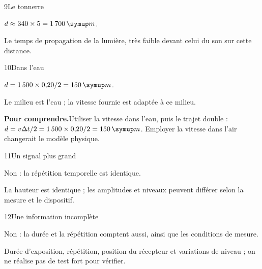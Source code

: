 \par\noindent\begin{minipage}{\linewidth}
\begin{corrige}{9}{Le tonnerre}
\begin{questions}
\item $d\approx340\times5=1\,700\unite m$.
\item Le temps de propagation de la lumière, très faible devant celui du son sur cette distance.
\end{questions}
\end{corrige}
\end{minipage}
\par\noindent\begin{minipage}{\linewidth}
\begin{corrige}{10}{Dans l’eau}
\begin{questions}
\item $d=1\,500\times0{,}20/2=150\unite m$.
\item Le milieu est l’eau ; la vitesse fournie est adaptée à ce milieu.
\end{questions}
\par\smallskip\noindent\textbf{Pour comprendre.}\enspace Utiliser la vitesse dans l’eau, puis le trajet double : $d=v\Delta t/2=1\,500\times0{,}20/2=150\unite m$. Employer la vitesse dans l’air changerait le modèle physique.\par
{}
\end{corrige}
\end{minipage}
\par\noindent\begin{minipage}{\linewidth}
\begin{corrige}{11}{Un signal plus grand}
\begin{questions}
\item Non : la répétition temporelle est identique.
\item La hauteur est identique ; les amplitudes et niveaux peuvent différer selon la mesure et le dispositif.
\end{questions}
\end{corrige}
\end{minipage}
\par\noindent\begin{minipage}{\linewidth}
\begin{corrige}{12}{Une information incomplète}
\begin{questions}
\item Non : la durée et la répétition comptent aussi, ainsi que les conditions de mesure.
\item Durée d’exposition, répétition, position du récepteur et variations de niveau ; on ne réalise pas de test fort pour vérifier.
\end{questions}
\end{corrige}
\end{minipage}
